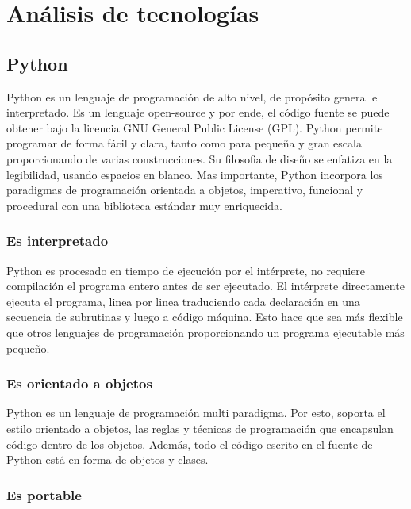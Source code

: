 \chapter{Análisis de tecnologías}
\label{sec:analisis_tecnologias}

\section[Python]{Python}

Python es un lenguaje de programación de alto nivel, de propósito general e interpretado. Es un lenguaje open-source y por ende, el código fuente se puede obtener bajo la licencia GNU General Public License (GPL). Python permite programar de forma fácil y clara, tanto como para pequeña y gran escala proporcionando de varias construcciones. Su filosofia de diseño se enfatiza en la legibilidad, usando espacios en blanco. Mas importante, Python incorpora los paradigmas de programación orientada a objetos, imperativo, funcional y procedural con una biblioteca estándar muy enriquecida.

\subsection[Es interpretado]{Es interpretado}

Python es procesado en tiempo de ejecución por el intérprete, no requiere compilación el programa entero antes de ser ejecutado. El intérprete directamente ejecuta el programa, linea por linea traduciendo cada declaración en una secuencia de subrutinas y luego a código máquina. Esto hace que sea más flexible que otros lenguajes de programación proporcionando un programa ejecutable más pequeño.

\subsection[Es orientado a objetos]{Es orientado a objetos}

Python es un lenguaje de programación multi paradigma. Por esto, soporta el estilo orientado a objetos, las reglas y técnicas de programación que encapsulan código dentro de los objetos. Además, todo el código escrito en el fuente de Python está en forma de objetos y clases.

\subsection[Es portable]{Es portable}

